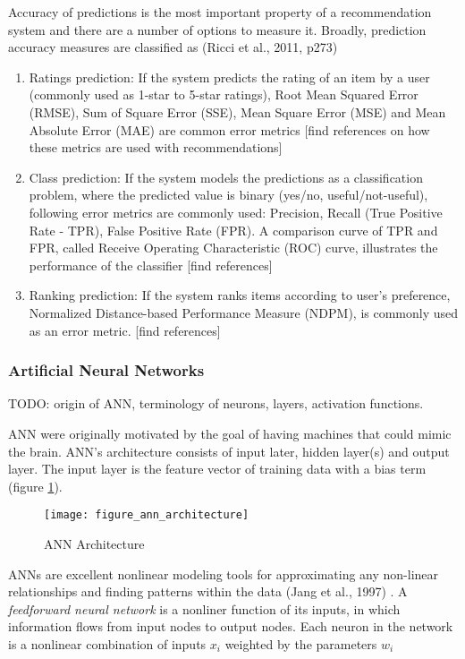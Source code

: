 \documentclass[12pt]{article}
\begin{document}
Accuracy of predictions is the most important property of a recommendation system and there are a number of options to measure it. Broadly, prediction accuracy measures are classified as (Ricci et al., 2011, p273) \cite{ricci}
\begin{enumerate}
	\item Ratings prediction: If the system predicts the rating of an item by a user (commonly used as 1-star to 5-star ratings), Root Mean Squared Error (RMSE), Sum of Square Error (SSE), Mean Square Error (MSE) and Mean Absolute Error (MAE) are common error metrics [find references on how these metrics are used with recommendations]
	\item Class prediction: If the system models the predictions as a classification problem, where the predicted value is binary (yes/no, useful/not-useful), following error metrics are commonly used: Precision, Recall (True Positive Rate - TPR), False Positive Rate (FPR). A comparison curve of TPR and FPR, called Receive Operating Characteristic (ROC) curve, illustrates the performance of the classifier [find references]
	\item Ranking prediction: If the system ranks items according to user's preference, Normalized Distance-based Performance Measure (NDPM), is commonly used as an error metric. [find references]
\end{enumerate}

\subsubsection{Artificial Neural Networks}
TODO: origin of ANN, terminology of neurons, layers, activation functions.

ANN were originally motivated by the goal of having machines that could mimic the brain. ANN's architecture consists of input later, hidden layer(s) and output layer. The input layer is the feature vector of training data with a bias term (figure \ref{fig:figure_ann_architecture}).
\begin{figure}
	\centering
	\texttt{[image: figure\_ann\_architecture]}
	\caption[ANN Architecture]{ANN Architecture}
	\label{fig:figure_ann_architecture}
\end{figure}

ANNs are excellent nonlinear modeling tools for approximating any non-linear relationships and finding patterns within the data (Jang et al., 1997) \cite{jang}. A \textit{feedforward neural network} is a nonliner function of its inputs, in which information flows from input nodes to output nodes. Each neuron in the network is a nonlinear combination of inputs $x_i$ weighted by the parameters $w_i$
\end{document}
